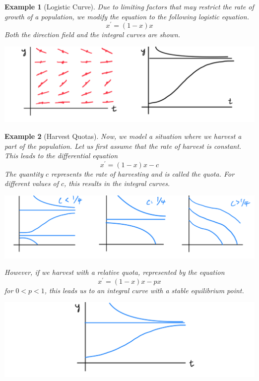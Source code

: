 \documentclass{article}
\newtheorem{example}{Example}[section]
\theoremstyle{remark}
\theoremstyle{definition}
\begin{document}
      \begin{example}[Logistic Curve]
      Due to limiting factors that may restrict the rate of growth of a population, we modify the equation to the following \textit{logistic equation}. 
      \[x^\prime = (1 - x) x\]
      Both the direction field and the integral curves are shown. 
      \begin{center}
          \includegraphics[scale=0.15]{img/Logistic_Curve.PNG}
      \end{center}
      \end{example}

      \begin{example}[Harvest Quotas]
      Now, we model a situation where we harvest a part of the population. Let us first assume that the rate of harvest is constant. This leads to the differential equation
      \[x^\prime = (1 - x) x - c\]
      The quantity $c$ represents the rate of harvesting and is called the \textit{quota}. For different values of $c$, this results in the integral curves. 
      \begin{center}
          \includegraphics[scale=0.2]{img/Harvest_Quotas.PNG}
      \end{center}
      However, if we harvest with a relative quota, represented by the equation
      \[x^\prime = (1 - x) x - p x\]
      for $0 < p < 1$, this leads us to an integral curve with a stable equilibrium point. 
      \begin{center}
          \includegraphics[scale=0.2]{img/Relative_Quota.PNG}
      \end{center}
      \end{example}
\end{document}
